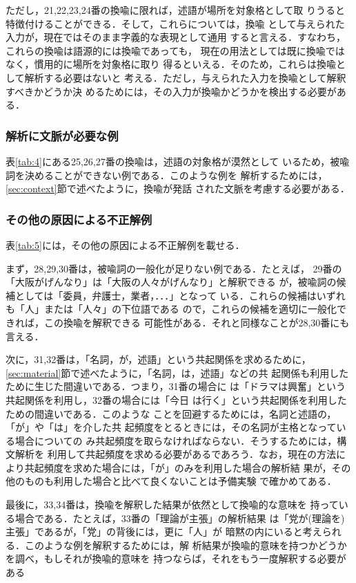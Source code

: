 ただし，21,22,23,24番の換喩に限れば，述語が場所を対象格として取
りうると特徴付けることができる．そして，これらについては，換喩
として与えられた入力が，現在ではそのまま字義的な表現として通用
すると言える．すなわち，これらの換喩は語源的には換喩であっても，
現在の用法としては既に換喩ではなく，慣用的に場所を対象格に取り
得るといえる．そのため，これらは換喩として解析する必要はないと
考える．ただし，与えられた入力を換喩として解釈すべきかどうか決
めるためには，その入力が換喩かどうかを検出する必要がある．

\subsubsection{解析に文脈が必要な例}

表\ref{tab:4}にある25,26,27番の換喩は，述語の対象格が漠然として
いるため，被喩詞を決めることができない例である．このような例を
解析するためには，\ref{sec:context}節で述べたように，換喩が発話
された文脈を考慮する必要がある．

\subsubsection{その他の原因による不正解例}

表\ref{tab:5}には，その他の原因による不正解例を載せる．

まず，28,29,30番は，被喩詞の一般化が足りない例である．たとえば，
29番の「大阪がげんなり」は「大阪の人々がげんなり」と解釈できる
が，被喩詞の候補としては「委員，弁護士，業者，．．．」となって
いる．これらの候補はいずれも「人」または「人々」の下位語である
ので，これらの候補を適切に一般化できれば，この換喩を解釈できる
可能性がある．それと同様なことが28,30番にも言える．

次に，31,32番は，「名詞，が，述語」という共起関係を求めるために，
\ref{sec:material}節で述べたように，「名詞，は，述語」などの共
起関係も利用したために生じた間違いである．つまり，31番の場合に
は「ドラマは興奮」という共起関係を利用し，32番の場合には「今日
は行く」という共起関係を利用したための間違いである．このような
ことを回避するためには，名詞と述語の，「が」や「は」を介した共
起頻度をとるときには，その名詞が主格となっている場合についての
み共起頻度を取らなければならない．そうするためには，構文解析を
利用して共起頻度を求める必要があるであろう．なお，現在の方法に
より共起頻度を求めた場合には，「が」のみを利用した場合の解析結
果が，その他のものも利用した場合と比べて良くないことは予備実験
で確かめてある．

最後に，33,34番は，換喩を解釈した結果が依然として換喩的な意味を
持っている場合である．たとえば，33番の「理論が主張」の解析結果
は「党が(理論を)主張」であるが，「党」の背後には，更に「人」が
暗黙の内にいると考えられる．このような例を解釈するためには，解
析結果が換喩的意味を持つかどうかを調べ，もしそれが換喩的意味を
持つならば，それをもう一度解釈する必要がある

